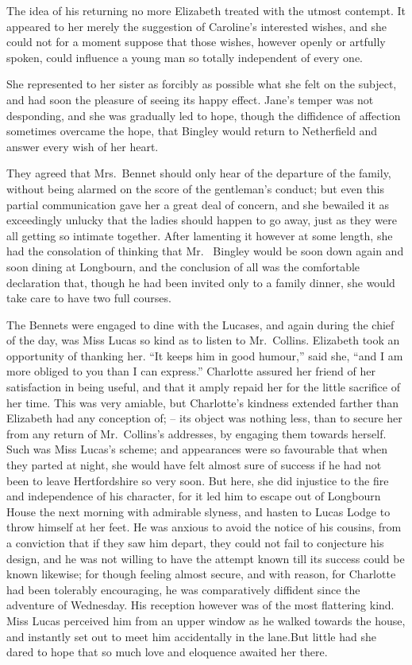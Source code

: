 The idea of his returning no more Elizabeth treated
with the utmost contempt. It appeared to her merely the
suggestion of Caroline’s interested wishes, and she could
not for a moment suppose that those wishes, however
openly or artfully spoken, could influence a young man so
totally independent of every one.

She represented to her sister as forcibly as possible
what she felt on the subject, and had soon the pleasure
of seeing its happy effect. Jane’s temper was not desponding,
and she was gradually led to hope, though the
diffidence of affection sometimes overcame the hope, that
Bingley would return to Netherfield and answer every wish
of her heart.

They agreed that Mrs.\ Bennet should only hear of the
departure of the family, without being alarmed on
the score of the gentleman’s conduct; but even this
partial communication gave her a great deal of concern,
and she bewailed it as exceedingly unlucky that the ladies
should happen to go away, just as they were all getting
so intimate together. After lamenting it however at some
length, she had the consolation of thinking that Mr.\ %
Bingley would be soon down again and soon dining at
Longbourn, and the conclusion of all was the comfortable
declaration that, though he had been invited only to a
family dinner, she would take care to have two full
courses.


The Bennets were engaged to dine with the Lucases,
and again during the chief of the day, was Miss Lucas so
kind as to listen to Mr.\ Collins. Elizabeth took an opportunity
of thanking her. “It keeps him in good humour,”
said she, “and I am more obliged to you than I can
express.” Charlotte assured her friend of her satisfaction
in being useful, and that it amply repaid her for the little
sacrifice of her time. This was very amiable, but Charlotte’s
kindness extended farther than Elizabeth had any
conception of; -- its object was nothing less, than to secure
her from any return of Mr.\ Collins’s addresses, by engaging
them towards herself. Such was Miss Lucas’s scheme;
and appearances were so favourable that when they
parted at night, she would have felt almost sure of success
if he had not been to leave Hertfordshire so very soon.
But here, she did injustice to the fire and independence
of his character, for it led him to escape out of Longbourn
House the next morning with admirable slyness, and
hasten to Lucas Lodge to throw himself at her feet. He
was anxious to avoid the notice of his cousins, from
a conviction that if they saw him depart, they could not
fail to conjecture his design, and he was not willing to
have the attempt known till its success could be known
likewise; for though feeling almost secure, and with
reason, for Charlotte had been tolerably encouraging, he
was comparatively diffident since the adventure of Wednesday.
His reception however was of the most flattering
kind. Miss Lucas perceived him from an upper window
as he walked towards the house, and instantly set out
to meet him accidentally in the lane.But little had she
dared to hope that so much love and eloquence awaited
her there.

